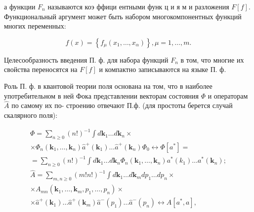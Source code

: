 \documentclass[10pt]{article}
\begin{document}
а функции $F_{n}$ называются коэ ффици ентными функ ц и я м и разложения $F[f]$. Функциональный аргумент может быть набором многокомпонентных функций многих переменных:



\[

f(x)=\left\{f_{\mu}\left(x_{1}, \ldots, x_{\alpha}\right)\right\}, \mu=1, \ldots, m .

\]



Целесообразность введения П. ф. для набора функций $F_{n}$ в том, что многие их свойства переносятся на $F[f]$ и компактно записываются на языке П. ф.



Роль П. ф. в квантовой теории поля основана на том, что в наиболее употребительном в ней Фока представлении векторам состояния $\Phi$ и операторам $\hat{A}$ по самому их по- строению отвечают П.ф. (для простоты берется случай скалярного поля):



\[

\begin{gathered}

\Phi=\sum_{n \geqslant 0}(n !)^{-1} \int d \mathbf{k}_{1} \ldots d \mathbf{k}_{n} \times \\

\times \Phi_{n}\left(\mathbf{k}_{1}, \ldots, \mathbf{k}_{n}\right) \hat{a}^{+}\left(\mathbf{k}_{1}\right) \ldots \hat{a}^{+}\left(\mathbf{k}_{n}\right) \Phi_{0} \leftrightarrow \Phi\left[a^{*}\right]= \\

=\sum_{n \geqslant 0}(n !)^{-1} \int d \mathbf{k}_{1} \ldots d \mathbf{k}_{n} \Phi_{n}\left(\mathbf{k}_{1}, \ldots, \mathbf{k}_{n}\right) a^{*}\left(k_{1}\right) \ldots a^{*}\left(\mathbf{k}_{n}\right) ; \\

\hat{A}=\sum_{m, n \geqslant 0}(m ! n !)^{-1} \int d \mathbf{k}_{1} \ldots d \mathbf{k}_{m} d p_{1} \ldots d p_{n} \times \\

\times A_{m n}\left(\mathbf{k}_{1}, \ldots, \mathbf{k}_{m}, p_{1}, \ldots, p_{n}\right) \times \\

\times \hat{a}^{+}\left(\mathbf{k}_{1}\right) \ldots \hat{a}^{+}\left(\mathbf{k}_{m}\right) \hat{a}^{-}\left(p_{1}\right) \ldots \hat{a}^{-}\left(p_{n}\right) \leftrightarrow A\left[a^{*}, a\right],

\end{gathered}

\]
\end{document}
